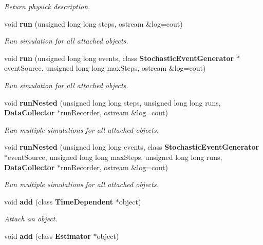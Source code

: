 \begin{CompactItemize}
\begin{CompactList}\small\item\em Return physick description. \item\end{CompactList}\item 
void {\bf run} (unsigned long long steps, ostream \&log=cout)
\begin{CompactList}\small\item\em Run simulation for all attached objects. \item\end{CompactList}\item 
void {\bf run} (unsigned long long events, class {\bf StochasticEventGenerator} $\ast$eventSource, unsigned long long maxSteps, ostream \&log=cout)
\begin{CompactList}\small\item\em Run simulation for all attached objects. \item\end{CompactList}\item 
void {\bf runNested} (unsigned long long steps, unsigned long long runs, {\bf DataCollector} $\ast$runRecorder, ostream \&log=cout)
\begin{CompactList}\small\item\em Run multiple simulations for all attached objects. \item\end{CompactList}\item 
void {\bf runNested} (unsigned long long events, class {\bf StochasticEventGenerator} $\ast$eventSource, unsigned long long maxSteps, unsigned long long runs, {\bf DataCollector} $\ast$runRecorder, ostream \&log=cout)
\begin{CompactList}\small\item\em Run multiple simulations for all attached objects. \item\end{CompactList}\item 
void {\bf add} (class {\bf TimeDependent} $\ast$object)\label{classTime_024e5e623073cb5e57f3d372aa73ac8e}

\begin{CompactList}\small\item\em Attach an object. \item\end{CompactList}\item 
void {\bf add} (class {\bf Estimator} $\ast$object)\label{classTime_7f708047aa102b67e62612decf90441c}


\end{CompactItemize}
